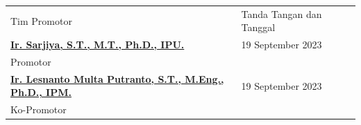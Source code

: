 {
\begin{longtable}{lll}
	\vspace*{2cm}
	\hspace*{27pt}Tim Promotor & \hspace*{-12pt}Tanda Tangan dan Tanggal\\
	\hspace*{-11pt}\underline{\textbf{Ir. Sarjiya, S.T., M.T., Ph.D., IPU.}}					& \hspace*{0.7cm} 19 September 2023\\ \vspace*{1.5cm}\hspace*{-11pt}Promotor    &\\
	\hspace*{-11pt}\underline{\textbf{Ir. Lesnanto Multa Putranto, S.T., M.Eng., Ph.D., IPM.}}	& \hspace*{0.7cm} 19 September 2023\\ \vspace*{1.5cm}\hspace*{-11pt}Ko-Promotor &\\
\end{longtable}
}
{}
\newpage
